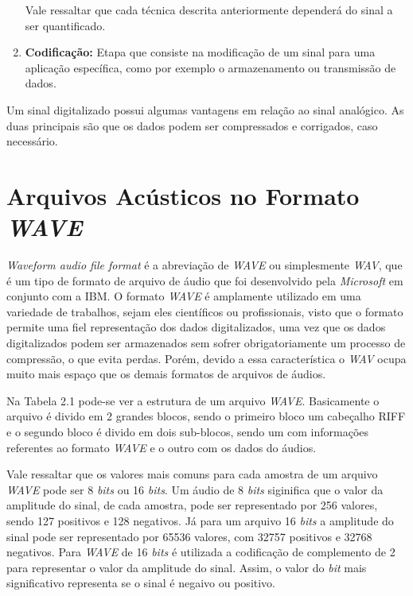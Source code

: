 \documentclass[a4paper,12pt,twoside,openright]{report}
\begin{document}
\begin{enumerate}
	\par  Vale ressaltar que cada t\'{e}cnica descrita anteriormente depender\'{a} do sinal a ser quantificado.
	
	\item{}	\textbf{Codifica{\c c}\~{a}o:} Etapa que consiste na modifica{\c c}\~{a}o de um sinal para uma aplica{\c c}\~{a}o espec\'{i}fica, como por exemplo o armazenamento ou transmiss\~{a}o de dados.
\end{enumerate}

\par Um sinal digitalizado possui algumas vantagens em rela{\c c}\~{a}o ao sinal anal\'{o}gico. As duas principais s\~{a}o que os dados podem ser compressados e corrigados, caso necess\'{a}rio. 

\section{Arquivos Ac\'{u}sticos no Formato \textit{WAVE}}
\label{secao_formato wave}
\par\textit{Waveform audio file format} \'{e} a abrevia\c{c}\~{a}o de \textit{WAVE} ou simplesmente \textit{WAV}, que \'{e} um tipo de formato de arquivo de \'{a}udio que foi desenvolvido pela \textit{Microsoft} em conjunto com a IBM. O formato \textit{WAVE} \'{e} amplamente utilizado em uma variedade de trabalhos, sejam eles cient\'{i}ficos ou profissionais, visto que o formato permite uma fiel representa\c{c}\~{a}o dos dados digitalizados, uma vez que os dados digitalizados podem ser armazenados sem sofrer obrigatoriamente um processo de compress\~{a}o, o que evita perdas. Por\'{e}m, devido a essa caracter\'{i}stica o \textit{WAV} ocupa muito mais espa\c{c}o que os demais formatos de arquivos de \'{a}udios. 

\par Na Tabela 2.1 pode-se ver a estrutura de um arquivo \textit{WAVE}. Basicamente o arquivo \'{e} divido em 2 grandes blocos, sendo o primeiro bloco um cabe{\c c}alho RIFF e o segundo bloco \'{e} divido em dois sub-blocos, sendo um com informa{\c c}\~{o}es referentes ao formato \textit{WAVE} e o outro com os dados do \'{a}udios.

\par Vale ressaltar que os valores mais comuns para cada amostra de um  arquivo \textit{WAVE} pode ser 8 \textit{bits} ou 16 \textit{bits}. Um \'{a}udio de 8 \textit{bits} siginifica que o valor da amplitude do sinal, de cada amostra, pode ser representado por 256 valores, sendo 127 positivos e 128 negativos. J\'{a} para um arquivo 16 \textit{bits} a amplitude do sinal pode ser representado por 65536 valores, com 32757 positivos e 32768 negativos. Para \textit{WAVE} de 16 \textit{bits} \'{e} utilizada a codifica{\c c}\~{a}o de complemento de 2 para representar o valor da amplitude do sinal. Assim, o valor do \textit{bit} mais significativo representa se o sinal \'{e} negaivo ou positivo.
\end{document}
